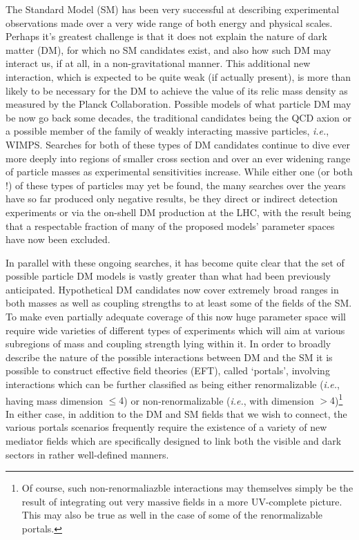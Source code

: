 \documentclass[14pt]{article}
\def\ie{{\it i.e.}}
\begin{document}
The Standard Model (SM) has been very successful at describing experimental observations made over a very wide range of both energy and physical scales. Perhaps it's greatest challenge is that 
it does not explain the nature of dark matter (DM), for which no SM candidates exist, and also how such DM may interact us, if at all, in a non-gravitational manner. This additional new interaction, which 
is expected to be quite weak (if actually present), is more than likely to be necessary for the DM to achieve the value of its relic mass density as measured by the Planck 
Collaboration\cite{Planck:2018vyg}. Possible models of what particle DM may be now go back some decades, the traditional candidates being the 
QCD axion\cite{Kawasaki:2013ae,Graham:2015ouw,Irastorza:2018dyq} or a possible member 
of the family of weakly interacting massive particles, \ie, WIMPS\cite{Arcadi:2017kky,Roszkowski:2017nbc}. Searches for both of these types of DM candidates continue to dive ever more deeply 
into regions of smaller cross section and over an ever widening range of particle masses as experimental sensitivities increase.  While either one (or both !) of these types of particles may yet be 
found, the many searches over the years have so far produced only negative results, be they direct or indirect detection experiments or via the on-shell DM production at 
the LHC\cite{LHC,Aprile:2018dbl,Fermi-LAT:2016uux,Amole:2019fdf,LZ:2022ufs}, with the result being that a respectable fraction of many of the proposed models' parameter spaces have now 
been excluded. 

In parallel with these ongoing searches, it has become quite clear that the set of possible particle DM models is vastly greater than what had been previously anticipated. Hypothetical DM candidates 
now cover extremely broad ranges in both masses as well as coupling strengths to at least some of the fields of 
the SM\cite{Alexander:2016aln,Battaglieri:2017aum,Bertone:2018krk,Cooley:2022ufh,Boveia:2022syt,Schuster:2021mlr}. To make even partially adequate coverage of this now huge parameter 
space will require wide varieties of different types of experiments which will aim at various subregions of mass and coupling strength lying within it. 
In order to broadly describe the nature of the possible interactions between DM and the SM it is possible to construct effective field theories (EFT), called `portals',  involving interactions which 
can be further classified as being either renormalizable (\ie, having mass dimension $\leq 4$) or non-renormalizable (\ie, with dimension $>4$){\footnote {Of course, such 
non-renormaliazble interactions may themselves simply be the result of integrating out very massive fields in a more UV-complete picture. This may also be true as well in the case of some of 
the renormalizable portals.}}  In either case, in addition to the DM and SM fields that we wish to connect, the various portals scenarios frequently require the existence of a variety of 
new mediator fields which are specifically designed to link both the visible and dark sectors in rather well-defined manners.
\end{document}
